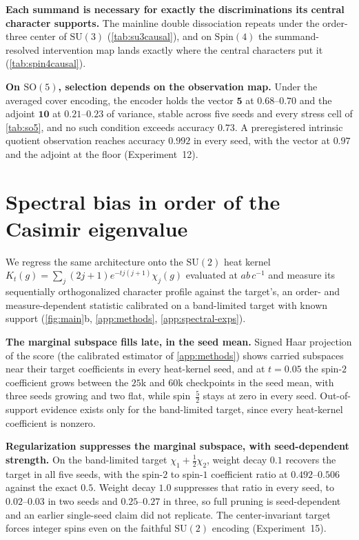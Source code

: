 \documentclass{article}
\newcommand{\SU}{\mathrm{SU}}
\newcommand{\SO}{\mathrm{SO}}
\newcommand{\Spin}{\mathrm{Spin}}
\begin{document}
\textbf{Each summand is necessary for exactly the discriminations its
central character supports.} The mainline double dissociation repeats under the order-three center of
$\SU(3)$ (\cref{tab:su3causal}), and on $\Spin(4)$ the summand-resolved
intervention map lands exactly where the central characters put it
(\cref{tab:spin4causal}).

\textbf{On $\SO(5)$, selection depends on the observation map.} Under the averaged cover encoding, the encoder holds the vector
$\mathbf{5}$ at $0.68$--$0.70$ and the adjoint $\mathbf{10}$ at
$0.21$--$0.23$ of variance, stable across five seeds and every stress
cell of \cref{tab:so5}, and no such condition exceeds accuracy $0.73$. A preregistered intrinsic quotient observation reaches accuracy $0.992$
in every seed, with the vector at $0.97$ and the adjoint at the floor
(Experiment~12).

\section{Spectral bias in order of the Casimir eigenvalue}
\label{sec:spectral}

We regress the same architecture onto the $\SU(2)$ heat kernel $K_t(g) =
\sum_j (2j+1) e^{-t j(j+1)} \chi_j(g)$ evaluated at $ab\,c^{-1}$ and
measure its sequentially orthogonalized character profile against the
target's, an order- and measure-dependent statistic calibrated on a
band-limited target with known support (\cref{fig:main}b,
\cref{app:methods}, \cref{app:spectral-exps}).

\textbf{The marginal subspace fills late, in the seed mean.} Signed Haar
projection of the score (the calibrated estimator of \cref{app:methods})
shows carried subspaces near their target coefficients in every
heat-kernel seed, and at $t = 0.05$ the spin-$2$ coefficient grows
between the $25$k and $60$k checkpoints in the seed mean, with three
seeds growing and two flat, while spin~$\tfrac52$ stays at zero in every
seed. Out-of-support evidence exists only for the band-limited target,
since every heat-kernel coefficient is nonzero.

\textbf{Regularization suppresses the marginal subspace, with
seed-dependent strength.} On the band-limited target $\chi_1 +
\tfrac12\chi_2$, weight decay $0.1$ recovers the target in all five
seeds, with the spin-$2$ to spin-$1$ coefficient ratio at
$0.492$--$0.506$ against the exact $0.5$. Weight decay $1.0$ suppresses that ratio in every seed, to
$0.02$--$0.03$ in two seeds and $0.25$--$0.27$ in three, so full pruning
is seed-dependent and an earlier single-seed claim did not replicate. The
center-invariant target forces integer spins even on the faithful
$\SU(2)$ encoding (Experiment~15).
\end{document}
